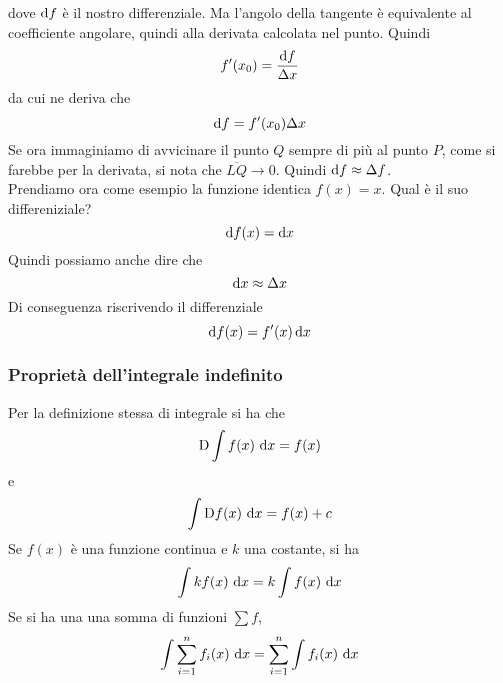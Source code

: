 dove $\mathop{}\!\mathrm{d} f$ è il nostro differenziale. Ma l'angolo della tangente è equivalente al coefficiente
angolare, quindi alla derivata calcolata nel punto. Quindi
\begin{equation*}
  f'(x_0) = \frac{\mathop{}\!\mathrm{d} f}{\Delta x}
\end{equation*}
da cui ne deriva che
\begin{equation*}
  \mathop{}\!\mathrm{d} f = f'(x_0)\Delta x
\end{equation*}
Se ora immaginiamo di avvicinare il punto $Q$ sempre di più al punto $P$, come si farebbe per la
derivata, si nota che $\overline{LQ}\to0$. Quindi $\mathop{}\!\mathrm{d} f\approx\Delta f$.\\
Prendiamo ora come esempio la funzione identica $f(x)=x$. Qual è il suo differeniziale?
\begin{equation*}
  \mathop{}\!\mathrm{d} f(x) = \mathop{}\!\mathrm{d} x
\end{equation*}
Quindi possiamo anche dire che
\begin{equation*}
  \mathop{}\!\mathrm{d} x \approx \Delta x
\end{equation*}
Di conseguenza riscrivendo il differenziale
\begin{equation*}
  \mathop{}\!\mathrm{d} f(x) = f'(x)\mathop{}\!\mathrm{d} x
\end{equation*}

\subsubsection{Proprietà dell'integrale indefinito}
Per la definizione stessa di integrale si ha che
\begin{equation*}
  \mathop{}\!\mathrm{D}\int f(x)\,\mathop{}\!\mathrm{d} x = f(x)
\end{equation*}
e
\begin{equation*}
  \int\mathop{}\!\mathrm{D} f(x)\,\mathop{}\!\mathrm{d} x = f(x)+c
\end{equation*}
Se $f(x)$ è una funzione continua e $k$ una costante, si ha
\begin{equation*}
  \int kf(x)\,\mathop{}\!\mathrm{d} x = k\int f(x)\,\mathop{}\!\mathrm{d} x
\end{equation*}
Se si ha una una somma di funzioni $\sum f$,
\begin{equation*}
  \int\sum\limits^{n}_{i=1} f_i(x)\,\mathop{}\!\mathrm{d} x = \sum\limits^{n}_{i=1} \int f_i(x)\,\mathop{}\!\mathrm{d} x
\end{equation*}

